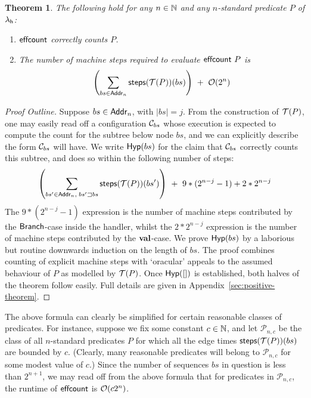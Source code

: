 \documentclass[12pt,phd,lfcs,twoside,openright,logo,leftchapter,normalheadings]{infthesis}
\theoremstyle{plain}
\newtheorem{theorem}{Theorem}[chapter]
\theoremstyle{definition}
\begin{document}
\begin{theorem}\label{thm:complexity-effectful-counting}
  The following hold for any $n \in \mathbb{N}$ and any $n$-standard predicate $P$ of $\lambda_{\mathsf{h}}$:
  \begin{enumerate}
  \item $\mathsf{effcount}$ correctly counts $P$.
  \item The number of machine steps required to evaluate $\mathsf{effcount}~P$ is
{\small
  \[
     \left( \displaystyle\sum_{bs \in \mathsf{Addr}_n} \mathsf{steps}(\mathcal{T}(P))(bs) \right) ~+~ \mathcal{O}(2^n)
  \]}%
\end{enumerate}
\end{theorem}
%
\begin{proof}[Proof Outline]
  Suppose $bs \in \mathsf{Addr}_n$, with $|bs|=j$.  From the construction of
  $\mathcal{T}(P)$, one may easily read off a configuration $\mathcal{C}_{bs}$ whose
  execution is expected to compute the count for the subtree below
  node $bs$, and we can explicitly describe the form $\mathcal{C}_{bs}$ will
  have.  We write $\mathsf{Hyp}(bs)$ for the claim that $\mathcal{C}_{bs}$
  correctly counts this subtree, and does so within the following
  number of steps: {\small
  \[
     \left( \displaystyle\sum_{bs' \in \mathsf{Addr}_n,\; bs' \sqsupset bs} \mathsf{steps}(\mathcal{T}(P))(bs') \right) ~+~ 9 * (2^{n-j} - 1) + 2*2^{n-j}
  \]
}%
%
The $9*(2^{n-j}-1)$ expression is the number of machine steps
contributed by the $\mathsf{Branch}$-case inside the handler, whilst the
$2*2^{n-j}$ expression is the number of machine steps contributed by
the $\mathbf{val}$-case.
%
We prove $\mathsf{Hyp}(bs)$ by a laborious but routine downwards
induction on the length of $bs$. The proof combines counting of
explicit machine steps with `oracular' appeals to the assumed
behaviour of $P$ as modelled by $\mathcal{T}(P)$. Once
$\mathsf{Hyp}([])$ is established, both halves of the theorem
follow easily.
%
Full details are given in Appendix~\ref{sec:positive-theorem}.
\end{proof}
%

The above formula can clearly be simplified for certain reasonable
classes of predicates. For instance, suppose we fix some constant
$c \in \mathbb{N}$, and let $\mathcal{P}_{n,c}$ be the class of all
$n$-standard predicates $P$ for which all the edge times
$\mathsf{steps}(\mathcal{T}(P))(bs)$ are bounded by $c$. (Clearly, many reasonable
predicates will belong to $\mathcal{P}_{n,c}$ for some modest value of
$c$.) Since the number of sequences $bs$ in question is less than
$2^{n+1}$, we may read off from the above formula that for predicates
in $\mathcal{P}_{n,c}$, the runtime of $\mathsf{effcount}$ is $\mathcal{O}(c2^n)$.
\end{document}
